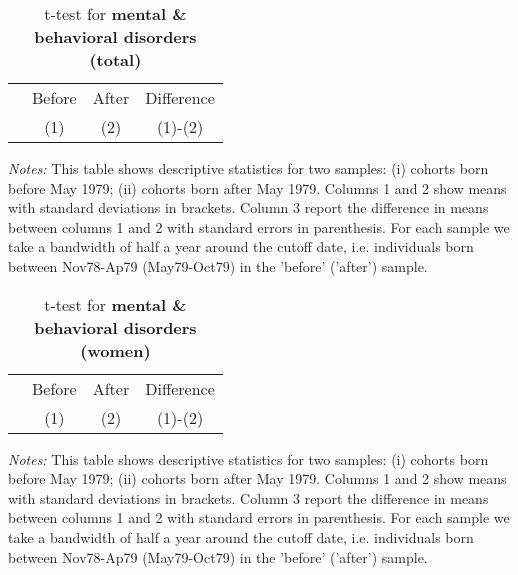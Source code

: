 \begin{table}[H] \centering 
	\begin{threeparttable} \centering \caption{t-test for \textbf{mental \& behavioral disorders (total)}}\label{tab:t-test_d5total}
		\begin{footnotesize}
			{\def\sym#1{\ifmmode^{#1}\else\(^{#1}\)\fi} 
			\begin{tabular}{l*{3}{c}}
				\toprule 
				& \multicolumn{1}{c}{Before} & \multicolumn{1}{c}{After} & \multicolumn{1}{c}{Difference} \\
				&\multicolumn{1}{c}{(1)}&\multicolumn{1}{c}{(2)}&\multicolumn{1}{c}{(1)-(2)}\\
				\midrule
				
				\bottomrule
			\end{tabular}}
		\end{footnotesize}
	\end{threeparttable} 
	\begin{minipage}{0.9\linewidth}
		\scriptsize \emph{Notes:} This table shows descriptive statistics for two samples: (i) cohorts born before May 1979; (ii) cohorts born after May 1979. Columns 1 and 2 show means with standard deviations in brackets. Column 3 report the difference in means between columns 1 and 2 with standard errors in parenthesis. For each sample we take a bandwidth of half a year around the cutoff date, i.e. individuals born between Nov78-Ap79 (May79-Oct79) in the 'before' ('after') sample.
	\end{minipage}
\end{table} 
\begin{table}[H] \centering 
	\begin{threeparttable} \centering \caption{t-test for \textbf{mental \& behavioral disorders (women)}}\label{tab:t-test_d5female}
		\begin{footnotesize}
			{\def\sym#1{\ifmmode^{#1}\else\(^{#1}\)\fi} 
				\begin{tabular}{l*{3}{c}}
					\toprule 
					& \multicolumn{1}{c}{Before} & \multicolumn{1}{c}{After} & \multicolumn{1}{c}{Difference} \\
					&\multicolumn{1}{c}{(1)}&\multicolumn{1}{c}{(2)}&\multicolumn{1}{c}{(1)-(2)}\\
					\midrule
					
					\bottomrule
			\end{tabular}}
		\end{footnotesize}
	\end{threeparttable} 
	\begin{minipage}{0.9\linewidth}
		\scriptsize \emph{Notes:} This table shows descriptive statistics for two samples: (i) cohorts born before May 1979; (ii) cohorts born after May 1979. Columns 1 and 2 show means with standard deviations in brackets. Column 3 report the difference in means between columns 1 and 2 with standard errors in parenthesis. For each sample we take a bandwidth of half a year around the cutoff date, i.e. individuals born between Nov78-Ap79 (May79-Oct79) in the 'before' ('after') sample.
	\end{minipage}
\end{table} 
